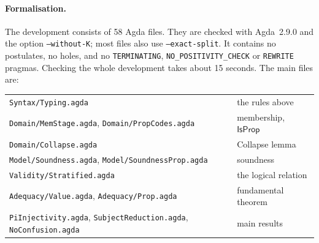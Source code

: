 \documentclass[11pt]{article}
\newcommand{\IsProp}{\mathsf{IsProp}}
\newcommand{\agda}[1]{\texttt{#1}}
\theoremstyle{plain}
\theoremstyle{remark}
\begin{document}
\paragraph{Formalisation.}
The development consists of 58 Agda files. They are checked with
Agda~2.9.0 and the option \agda{--without-K}; most files also use
\agda{--exact-split}.
It contains no postulates, no holes, and no \agda{TERMINATING},
\agda{NO\_POSITIVITY\_CHECK} or \agda{REWRITE} pragmas. Checking the whole
development takes about 15 seconds. The main files are:
\begin{center}\small
\begin{tabular}{p{9cm}l}
\agda{Syntax/Typing.agda} & the rules above \\
\agda{Domain/MemStage.agda}, \agda{Domain/PropCodes.agda} & membership, $\IsProp$ \\
\agda{Domain/Collapse.agda} & Collapse lemma \\
\agda{Model/Soundness.agda}, \agda{Model/SoundnessProp.agda} & soundness \\
\agda{Validity/Stratified.agda} & the logical relation \\
\agda{Adequacy/Value.agda}, \agda{Adequacy/Prop.agda} & fundamental theorem \\
\agda{PiInjectivity.agda}, \agda{SubjectReduction.agda}, \agda{NoConfusion.agda} & main results
\end{tabular}
\end{center}
\end{document}
